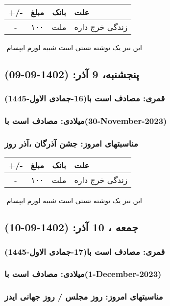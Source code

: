 \documentclass{article}
\newcommand{\rnote}[1]{\marginpar{\textcolor{color}{\StrSubstitute{\##1}{ }{\_}}}}
\newcommand{\myRow}[4]{
    #1 & #2 & #3 & #4 \\ \hline
}
\begin{document}
\begin{tabular}{ | c | c | c | p{5cm} |}
    \hline
    \myRow{ +/- }{مبلغ}{بانک}{علت}
    \myRow{-}{۱۰۰}{ملت}{زندگی خرج داره}
\end{tabular}
\newline
\newline

‌
\rnote{تست}
این نیز یک نوشته تستی است شبیه لورم ایپسام




\newpage
{}
\textcolor{color}{
\section{ پنجشنبه، 9 آذر: (1402-09-09) }
\subsubsection*{قمری: مصادف است با(16-جمادی الاول-1445)} 
\subsubsection*{میلادی: مصادف است با(30-November-2023)}
\subsubsection*{مناسبتهای امروز: جشن آذرگان ،آذر روز}
}


\begin{tabular}{ | c | c | c | p{5cm} |}
    \hline
    \myRow{ +/- }{مبلغ}{بانک}{علت}
    \myRow{-}{۱۰۰}{ملت}{زندگی خرج داره}
\end{tabular}
\newline
\newline

‌
\rnote{تست}
این نیز یک نوشته تستی است شبیه لورم ایپسام




\newpage
{}
\textcolor{color}{
\section{ جمعه ، 10 آذر: (1402-09-10) }
\subsubsection*{قمری: مصادف است با(17-جمادی الاول-1445)} 
\subsubsection*{میلادی: مصادف است با(1-December-2023)}
\subsubsection*{مناسبتهای امروز: روز مجلس / روز جهانی ایدز}
}
\end{document}
